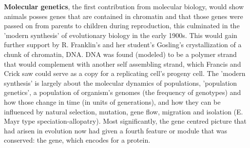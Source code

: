 \textbf{Molecular genetics}, the first contribution from molecular biology, would show animals posses genes that are contained in chromatin and that those genes were passed on from parents to children during reproduction, this culminated in the 'modern synthesis' of evolutionary biology in the early 1900s.  This would gain further support by R. Franklin's and her student's Gosling's crystallization of a chunk of chromatin, DNA\cite{pmid13054694}.  DNA was found (modeled) to be a polymer strand that would complement with another self assembling strand, which Francis and Crick saw could serve as a copy for a replicating cell's progeny cell\cite{pmid13054692}.  The 'modern synthesis' is largely about the molecular dynamics of populations, 'population genetics', a population of organism's genomes (the frequency of genotypes) and how those change in time (in units of generations), and how they can be influenced by natural selection, mutation, gene flow, migration and isolation (E. Mayr type speciation-allopatry).  Most significantly, the gene centred picture that had arisen in evolution now had given a fourth feature or module that was conserved: the gene, which encodes for a protein. 
